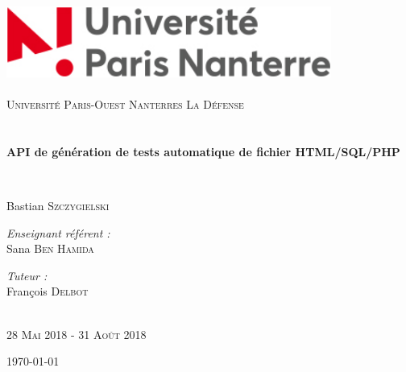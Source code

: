 \begin{titlepage}
\begin{center}

\includegraphics[width=0.8\textwidth]{./logo}~\\[1cm]

\textsc{\Large }\\[1cm]

\textsc{\LARGE Université Paris-Ouest Nanterres La Défense}\\[1.5cm]

\textsc{\Large }\\[1cm]

\HRule \\[0.4cm]

{\huge \bfseries API de génération de tests automatique de fichier HTML/SQL/PHP\\[0.4cm] }

\HRule \\[1.5cm]

\begin{minipage}{0.4\textwidth}
\begin{flushleft} \large
Bastian \textsc{Szczygielski}
\end{flushleft}
\end{minipage}
\begin{minipage}{0.4\textwidth}
\begin{flushright} \large
\emph{Enseignant référent :} \\
Sana \textsc{Ben Hamida}
\end{flushright}
\begin{flushright} \large
\emph{Tuteur :} \\
François \textsc{Delbot}
\end{flushright}
\end{minipage}

\textsc{\Large }\\[1cm]

\textsc{\Large 28 Mai 2018 - 31 Août 2018}\\[1cm]

\vfill

{\large \today}

\end{center}
\end{titlepage}